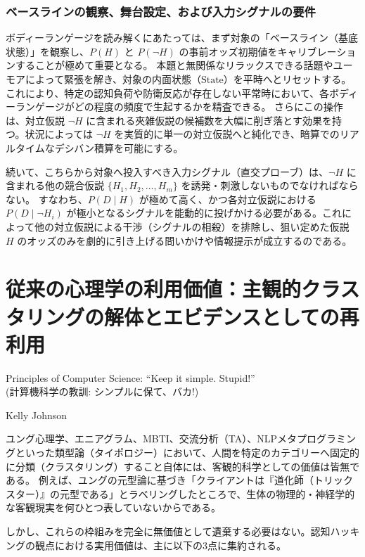 \subsubsection*{ベースラインの観察、舞台設定、および入力シグナルの要件}
ボディーランゲージを読み解くにあたっては、まず対象の「ベースライン（基底状態）」を観察し、$P(H)$ と $P(\neg H)$ の事前オッズ初期値をキャリブレーションすることが極めて重要となる。
本題と無関係なリラックスできる話題やユーモアによって緊張を解き、対象の内面状態（$\mathrm{State}$）を平時へとリセットする。これにより、特定の認知負荷や防衛反応が存在しない平常時において、各ボディーランゲージがどの程度の頻度で生起するかを精査できる。
さらにこの操作は、対立仮説 $\neg H$ に含まれる夾雑仮説の候補数を大幅に削ぎ落とす効果を持つ。状況によっては $\neg H$ を実質的に単一の対立仮説へと純化でき、暗算でのリアルタイムなデシバン積算を可能にする。

続いて、こちらから対象へ投入すべき入力シグナル（直交プローブ）は、$\neg H$ に含まれる他の競合仮説 $\{H_1, H_2, \dots, H_m\}$ を誘発・刺激しないものでなければならない。
すなわち、$P(D \mid H)$ が極めて高く、かつ各対立仮説における $P(D \mid \neg H_i)$ が極小となるシグナルを能動的に投げかける必要がある。これによって他の対立仮説による干渉（シグナルの相殺）を排除し、狙い定めた仮説 $H$ のオッズのみを劇的に引き上げる問いかけや情報提示が成立するのである。

\section{従来の心理学の利用価値：主観的クラスタリングの解体とエビデンスとしての再利用}
\epigraph{Principles of Computer Science: ``Keep it simple. Stupid!''\\(計算機科学の教訓: シンプルに保て、バカ!)}{Kelly Johnson}

ユング心理学、エニアグラム、MBTI、交流分析（TA）、NLPメタプログラミングといった類型論（タイポロジー）において、人間を特定のカテゴリーへ固定的に分類（クラスタリング）すること自体には、客観的科学としての価値は皆無である。
例えば、ユングの元型論に基づき「クライアントは『道化師（トリックスター）』の元型である」とラベリングしたところで、生体の物理的・神経学的な客観現実を何ひとつ表していないからである。

しかし、これらの枠組みを完全に無価値として遺棄する必要はない。認知ハッキングの観点における実用価値は、主に以下の3点に集約される。

